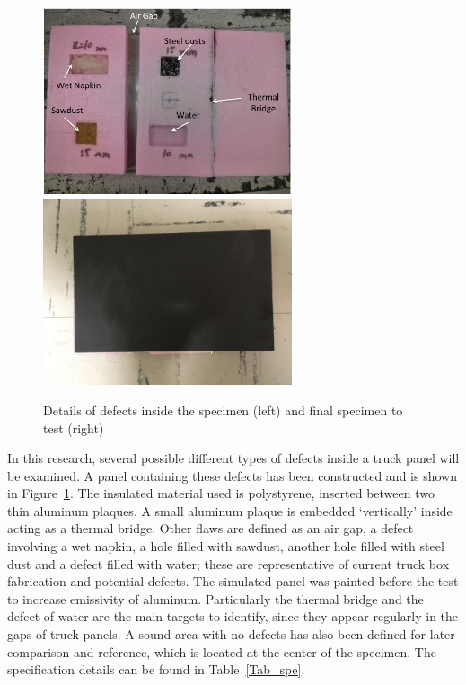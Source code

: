 \documentclass{tQRT2e}
\begin{document}
\begin{figure}
	\includegraphics[width=7.33cm, height=5.5cm]{Panel_detail}
	\includegraphics[width=7.33cm, height=5.5cm]{Panel_done}
	\caption{Details of defects inside the specimen (left) and final specimen to test (right) }
	\label{panel}
\end{figure}
\indent \indent In this research, several possible different types of defects inside a truck panel will be examined.  A panel containing these defects has been constructed and is shown in Figure~\ref{panel}. The insulated material used is polystyrene, inserted between two thin aluminum plaques. A small aluminum plaque is embedded ‘vertically’ inside acting as a thermal bridge. Other flaws are defined as an air gap, a defect involving a wet napkin, a hole filled with sawdust, another hole filled with steel dust and a defect filled with water; these are representative of current truck box fabrication and potential defects. The simulated panel was painted before the test to increase emissivity of aluminum. Particularly the thermal bridge and the defect of water are the main targets to identify, since they appear regularly in the gaps of truck panels. A sound area with no defects has also been defined for later comparison and reference, which is located at the center of the specimen. The specification details can be found in Table~\ref{Tab_spe}.
\end{document}
